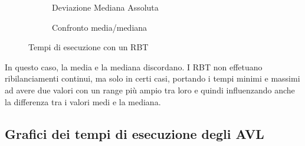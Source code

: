\documentclass[a4paper,titlepage]{article}
\begin{document}
\begin{figure}[h]
  \centering
  \begin{subfigure}{\textwidth}
    \captionsetup{justification=centering}
    \caption{Deviazione Mediana Assoluta}
     \label{fig:rbt_mad}
  \end{subfigure}%
   \vspace{2pt}
  \begin{subfigure}{\textwidth}
    \captionsetup{justification=centering}
     \caption{Confronto media/mediana}
     \label{fig:rbt_mean_median}
  \end{subfigure}
  \caption{Tempi di esecuzione con un RBT}
\end{figure}

In questo caso, la media e la mediana discordano. I RBT non effetuano ribilanciamenti continui, ma solo in certi casi, portando i tempi minimi e massimi ad avere due valori con un range più ampio tra loro e quindi influenzando anche la differenza tra i valori medi e la mediana.
\newpage

\subsection{Grafici dei tempi di esecuzione degli AVL }
\end{document}
